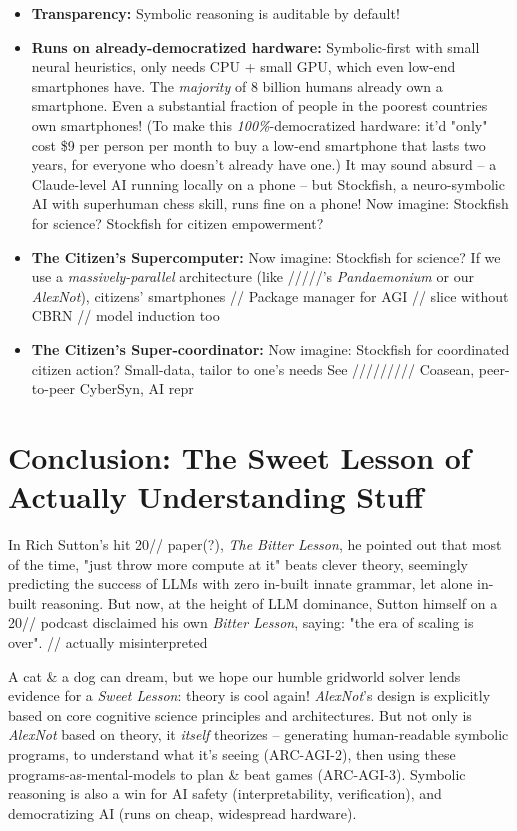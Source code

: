 \documentclass{article}
\begin{document}
\begin{itemize}
    \item \textbf{Transparency:} Symbolic reasoning is auditable by default!
    \item \textbf{Runs on already-democratized hardware:} Symbolic-first with small neural heuristics, only needs CPU + small GPU, which even low-end smartphones have. The \textit{majority} of 8 billion humans already own a smartphone. Even a substantial fraction of people in the poorest countries own smartphones! (To make this \textit{100\%}-democratized hardware: it'd "only" cost \$9 per person per month to buy a low-end smartphone that lasts two years, for everyone who doesn't already have one.) It may sound absurd -- a Claude-level AI running locally on a phone -- but Stockfish, a neuro-symbolic AI with superhuman chess skill, runs fine on a phone! Now imagine: Stockfish for science? Stockfish for citizen empowerment?
    \item \textbf{The Citizen's Supercomputer:} Now imagine: Stockfish for science? If we use a \textit{massively-parallel} architecture (like /////'s \textit{Pandaemonium} or our \textit{AlexNot}), citizens' smartphones // Package manager for AGI // slice without CBRN // model induction too
    \item \textbf{The Citizen's Super-coordinator:} Now imagine: Stockfish for coordinated citizen action? Small-data, tailor to one's needs See /////////  Coasean, peer-to-peer CyberSyn, AI repr
\end{itemize}

\section{Conclusion: The Sweet Lesson of Actually Understanding Stuff}

In Rich Sutton's hit 20// paper(?), \textit{The Bitter Lesson}, he pointed out that most of the time, "just throw more compute at it" beats clever theory, seemingly predicting the success of LLMs with zero in-built innate grammar, let alone in-built reasoning. But now, at the height of LLM dominance, Sutton himself on a 20// podcast disclaimed his own \textit{Bitter Lesson}, saying: "the era of scaling is over". // actually misinterpreted

A cat \& a dog can dream, but we hope our humble gridworld solver lends evidence for a \textit{Sweet Lesson}: theory is cool again! \textit{AlexNot}'s design is explicitly based on core cognitive science principles and architectures. But not only is \textit{AlexNot} based on theory, it \textit{itself} theorizes -- generating human-readable symbolic programs, to understand what it's seeing (ARC-AGI-2), then using these programs-as-mental-models to plan \& beat games (ARC-AGI-3). Symbolic reasoning is also a win for AI safety (interpretability, verification), and democratizing AI (runs on cheap, widespread hardware).
\end{document}
